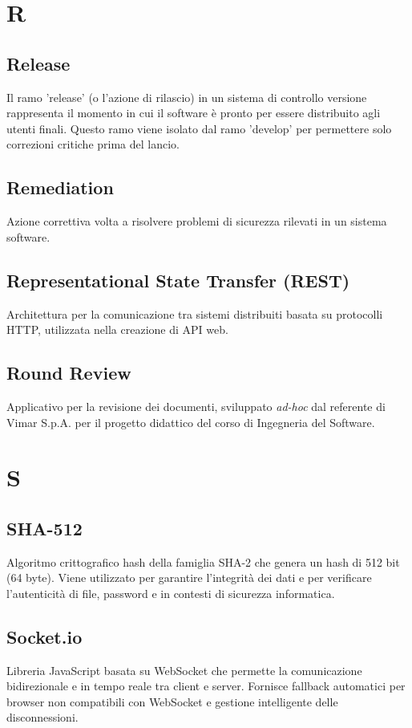 \documentclass[10pt, letterpaper]{article}
\begin{document}
\section{R}

\subsection*{Release}
Il ramo 'release' (o l'azione di rilascio) in un sistema di controllo versione rappresenta il momento in cui il software è pronto per essere distribuito
agli utenti finali. Questo ramo viene isolato dal ramo 'develop' per permettere solo correzioni critiche prima del lancio.

\subsection*{Remediation}
Azione correttiva volta a risolvere problemi di sicurezza rilevati in un sistema software.

\subsection*{Representational State Transfer (REST)}
Architettura per la comunicazione tra sistemi distribuiti basata su protocolli HTTP, utilizzata nella creazione di API web.

\subsection*{Round Review}
Applicativo per la revisione dei documenti, sviluppato \textit{ad-hoc} dal referente di Vimar S.p.A. per il progetto didattico del corso di Ingegneria del Software.

\section{S}

\subsection*{SHA-512}
Algoritmo crittografico hash della famiglia SHA-2 che genera un hash di 512 bit (64 byte). Viene utilizzato per garantire l'integrità dei dati e per verificare l'autenticità di file, password e in contesti di sicurezza informatica.

\subsection*{Socket.io}
Libreria JavaScript basata su WebSocket che permette la comunicazione bidirezionale e in tempo reale tra client e server. Fornisce fallback automatici per browser non compatibili con WebSocket e gestione intelligente delle disconnessioni.
\end{document}
